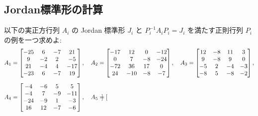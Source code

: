 \documentclass[12pt,twoside]{jarticle}
\begin{document}

\subsection{Jordan標準形の計算}


\begin{question}[各 $A_i$ ごとに10点]
\label{q:Jordan-normal-form-example}
  以下の実正方行列 $A_i$ の Jordan 標準形 $J_i$ と $P_i^{-1}A_iP_i=J_i$ 
  を満たす正則行列 $P_i$ の例を一つ求めよ:
  {\small
  \begin{align*}
    &
    A_1 =
    \begin{bmatrix}
      -25 &   6 &  -7 &  21 \\
        9 &  -2 &   2 &  -5 \\
       21 &  -4 &   4 & -17 \\
      -23 &   6 &  -7 &  19 \\
    \end{bmatrix},
    \quad
    A_2 =
    \begin{bmatrix}
      -17 &  12 &   0 & -12 \\
        0 &   7 &  -8 & -24 \\
      -72 &  36 &  17 &   0 \\
       24 & -10 &  -8 &  -7 \\
    \end{bmatrix},
    \quad
    A_3 =
    \begin{bmatrix}
      12 &  -8 &  11 &   3 \\
       9 &  -8 &   9 &   0 \\
      -5 &   2 &  -4 &  -3 \\
      -8 &   5 &  -8 &  -2 \\
    \end{bmatrix},
    \\[\medskipamount] &
    A_4 =
    \begin{bmatrix}
       -4 &  -6 &   5 &   5 \\
       -4 &   7 &  -9 & -11 \\
      -24 &  -9 &   1 &  -3 \\
       16 &  12 &  -7 &  -6 \\
    \end{bmatrix},
    \quad
    A_5 =
    \begin{bmatrix}

\end{bmatrix}
\end{align*}}
\end{question}
\end{document}
